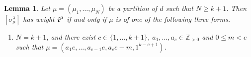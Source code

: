 \documentclass[twoside,11pt,reqno,letter]{amsart}
\numberwithin{equation}{section}
\newtheorem{Lemma}[equation]{Lemma}
\theoremstyle{definition}  %
\def\bi{\text{\boldmath$i$}}
\newcommand{\Z}{\mathbb{Z}}
\newcommand{\0}{{\bar 0}}
\newcommand{\1}{{\bar 1}}
\newcommand{\la}{\lambda}
\newcommand{\si}{\sigma}
\begin{document}
{\begin{Lemma}\label{lem:muForms}
  Let $\mu = (\mu_1, \dots, \mu_N)$ be a partition of $d$ such that $N \geq k+1$. Then $[\si^\la_\mu]$ has weight $\bi^\mu$ if and only if $\mu$ is of one of the following three forms.%
  \begin{enumerate}
    \item $N = k+1$, and there exist $c \in \{1, \dots, k+1\}$, $a_1, \dots, a_c \in \Z_{>0}$ and $0 \leq m < e$ such that $\mu = (a_1 e, \dots, a_{c-1} e, a_c e - m, 1^{k-c+1})$. 
\iffalse
\[
\begin{tikzpicture}[scale=0.5,draw/.append style={thick,black},baseline=1mm]
  \fill[red!50](0.5,-0.5)rectangle(1.5,-8.5);
  \newcount\col
  \foreach\Row/\row in {{1,...,16}/0,{1,...,12}/-1,{1,...,12}/-2,{1,...,8}/-3,{1,2,3}/-4,{1}/-5,{1}/-6,{1}/-7,{1}/-8} {
     \col=1
     \foreach\k in \Row {
        \draw(\the\col,\row)+(-.5,-.5)rectangle++(.5,.5);
        \global\advance\col by 1
      }
   }
   \draw(0,0)node[left]{$a_1 e$};
   \draw(0,-1)node[left]{$a_2 e$};
   \draw(0,-2)node[left]{$\dots$};
   \draw(0,-3)node[left]{$a_{c-1} e$};
   \draw(0,-4)node[left]{$a_c e - m$};
   \draw(0,-5)node[left]{$1$};
   \draw(0,-6)node[left]{$1$};
   \draw(0,-7)node[left]{$\dots$};
   \draw(0,-8)node[left]{$1$};
\end{tikzpicture}
\]
\fi


\end{enumerate}
\end{Lemma}}
\end{document}
